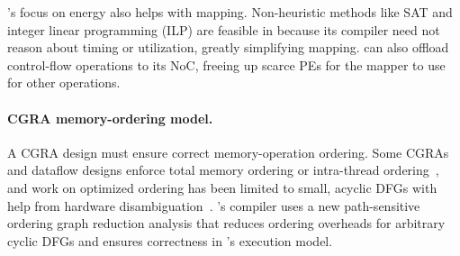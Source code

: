 \riptide's focus on energy also helps with mapping.
% 
Non-heuristic methods like SAT and integer linear programming (ILP) are feasible in \riptide
%
because its compiler need not reason about timing or utilization,
greatly simplifying mapping.
%
\riptide can also offload control-flow operations to its NoC, freeing up scarce PEs for the mapper to use for other operations.



\paragraph{CGRA memory-ordering model.}

A CGRA design must ensure correct memory-operation ordering.
%
%
%
Some CGRAs and dataflow designs enforce total memory ordering or intra-thread
ordering~\cite{swanson2003wavescalar, voitsechov2014single}, and work on optimized 
ordering has been limited to small, acyclic DFGs with help from hardware disambiguation~\cite{nachos}.
%
\riptide's compiler uses a new path-sensitive ordering graph reduction analysis
that reduces ordering overheads for arbitrary cyclic DFGs and ensures correctness 
in \riptide's execution model.



